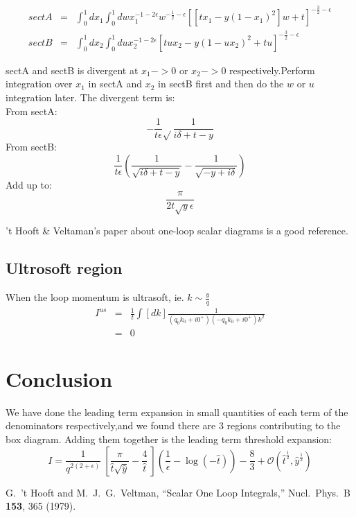 \documentclass{article}
\begin{document}
\begin{eqnarray}
sectA&=&\int_0^1dx_1\int_0^1dwx_1^{-1-2\epsilon}w^{-\frac{1}{2}-\epsilon}[[tx_1-y(1-x_1)^2]w+t]^{-\frac{3}{2}-\epsilon}\\
sectB&=&\int_0^1dx_2\int_0^1dux_2^{-1-2\epsilon}[tux_2-y(1-ux_2)^2+tu]^{-\frac{3}{2}-\epsilon}
\end{eqnarray}

sectA and sectB is divergent at $x_1->0$ or $x_2->0$ respectively.Perform integration over $x_1$ in sectA and $x_2$ in sectB first and then do the $w$ or $u$ integration later. The divergent term is:\\
From sectA:\\
\begin{equation*}
-\frac{1}{t \epsilon}\sqrt{}\frac{1}{i \delta +t-y}
\end{equation*}
From sectB:\\
\begin{equation*}
\frac{1}{t \epsilon }(\frac{1}{\sqrt{i \delta +t-y}}-\frac{1}{\sqrt{-y+i \delta }})
\end{equation*}
Add up to:\\
\begin{equation}
\frac{\pi }{2 t \sqrt{y} \epsilon }
\end{equation}



't Hooft \& Veltaman's paper about one-loop scalar diagrams is a good reference. \cite{'tHooft:1978xw}










\subsection{Ultrosoft region}
When the loop momentum is ultrasoft, ie. $k\sim \frac{y}{q}$
\begin{eqnarray}
I^{us}&=&\frac{1}{t}\int[dk]\frac{1}{(q_0k_0+i0^+)(-q_0k_0+i0^+)k^2}\\\nonumber
&=&0
\end{eqnarray}


\section{Conclusion}
We have done the leading term expansion in small quantities of each term of the denominators respectively,and we found there are 3 regions contributing to the box diagram. Adding them together is the leading term threshold expansion:
\begin{equation}
I=\frac{1}{q^{2(2+\epsilon)}}~[\frac{\pi}{\hat{t}\sqrt{\hat{y}}}-\frac{4}{\hat{t}}~](\frac{1}{\epsilon}-\log(-\hat{t}))-\frac{8}{3}+\mathcal{O}(\hat{t}^\frac{1}{2},\hat{y}^\frac{1}{2})
\end{equation}

\begin{thebibliography}{1}
  G.~'t Hooft and M.~J.~G.~Veltman,
  ``Scalar One Loop Integrals,''
  Nucl.\ Phys.\ B {\bf 153}, 365 (1979).
\end{thebibliography}
\end{document}
